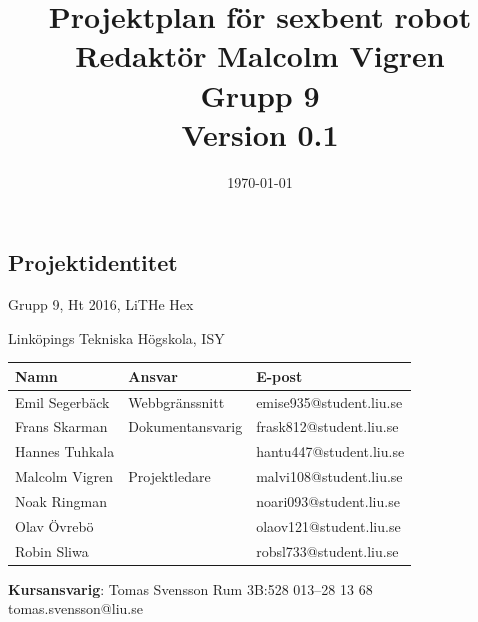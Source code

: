 \documentclass[a4paper,titlepage,12pt]{article}
\begin{document}
    \title{\LARGE
        \textbf{Projektplan för sexbent robot} \\
        \vspace*{0.5\baselineskip}
        \large
        Redaktör Malcolm Vigren \\
        Grupp 9 \\
        \small
        \vspace*{0.5\baselineskip}
        Version 0.1}

    \date{\today}

	\maketitle
	
	\newpage
	
	\begin{center}


		\section*{Projektidentitet}
		Grupp 9, Ht 2016, LiTHe Hex

		Linköpings Tekniska Högskola, ISY

		\renewcommand*{\arraystretch}{1.4}
		\begin{longtable}[c]{ l l l }
			\textbf{Namn} & \textbf{Ansvar} & \textbf{E-post} \\ \midrule
			Emil Segerbäck & Webbgränssnitt & emise935@student.liu.se \\ \midrule
			Frans Skarman & Dokumentansvarig & frask812@student.liu.se \\ \midrule
			Hannes Tuhkala & & hantu447@student.liu.se \\ \midrule
			Malcolm Vigren & Projektledare & malvi108@student.liu.se \\ \midrule
			Noak Ringman &  & noari093@student.liu.se \\ \midrule
			Olav Övrebö &  & olaov121@student.liu.se \\ \midrule
			Robin Sliwa &  & robsl733@student.liu.se \\
		\end{longtable}

		\centering
		\textbf{Kursansvarig}: Tomas Svensson Rum 3B:528 013--28 13 68 tomas.svensson@liu.se


\end{center}
\end{document}
